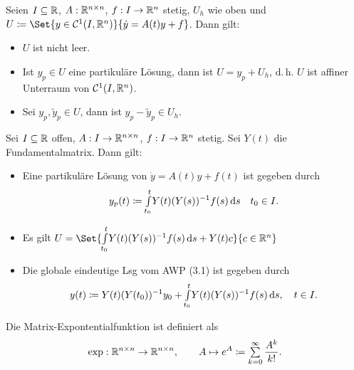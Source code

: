 \documentclass{cheat-sheet}
\begin{document}
\begin{satz}%
  Seien $I \subseteq \mathbb{R}$, $A : \mathbb{R}^{n \times n}$, $f : I \to \mathbb{R}^n$ stetig, $U_h$ wie oben und $U \coloneqq \Set{ y \in \mathcal{C}^1(I, \R^n) }{ \dot{y} = A(t) y + f }$. Dann gilt:
  \begin{itemize}
    \item $U$ ist nicht leer.
    \item Ist $y_p \in U$ eine partikuläre Lösung, dann ist $U = y_p + U_h$, d.\,h. $U$ ist affiner Unterraum von $\mathcal{C}^1(I, \mathbb{R}^n)$.
    \item Sei $y_p, \tilde{y}_p \in U$, dann ist $y_p - \tilde{y}_p \in U_h$.
  \end{itemize}
\end{satz}

\begin{satz}
  Sei $I \subseteq \mathbb{R}$ offen, $A : I \to \mathbb{R}^{n \times n}$, $f : I \to \mathbb{R}^n$ stetig. Sei $Y(t)$ die Fundamentalmatrix. Dann gilt:
  \begin{itemize}
    \item Eine partikuläre Lösung von $\dot{y} = A(t) y + f(t)$ ist gegeben durch
    \[ y_p(t) \coloneqq {\textstyle \int\limits_{t_0}^{t}} Y(t) (Y(s))^{-1} f(s) \,\mathrm{d} s \quad t_0 \in I. \]
    \item Es gilt $U = \Set{ \Int{t_0}{t}{Y(t) (Y(s))^{-1} f(s)}{s} + Y(t) c }{ c \in \R^n }$
    \item Die globale eindeutige Lsg vom AWP (3.1) ist gegeben durch
    \[ y(t) \coloneqq Y(t) (Y(t_0))^{-1} y_0 + {\textstyle \int\limits_{t_0}^{t}} Y(t) (Y(s))^{-1} f(s) \,\mathrm{d} s, \quad t \in I. \]
  \end{itemize}
\end{satz}


\begin{defn}
  Die Matrix-Expontentialfunktion ist definiert als
  \[ \exp : \R^{n \times n} \to \R^{n \times n}, \qquad A \mapsto e^A \coloneqq \sum_{k=0}^\infty \frac{A^k}{k!}. \]
\end{defn}
\end{document}
